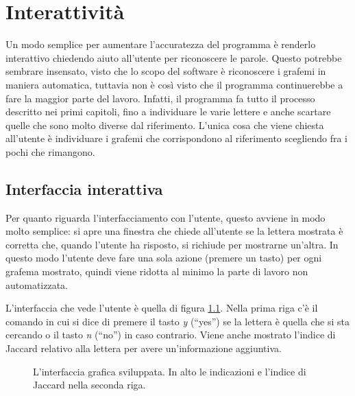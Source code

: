 \chapter{Interattivit\`a}\label{ch:interactivity}

Un modo semplice per aumentare l'accuratezza del programma \`e renderlo interattivo chiedendo aiuto all'utente per riconoscere le parole. Questo potrebbe sembrare insensato, visto che lo scopo del software \`e riconoscere i grafemi in maniera automatica, tuttavia non \`e cos\`i visto che il programma continuerebbe a fare la maggior parte del lavoro. Infatti, il programma fa tutto il processo descritto nei primi capitoli, fino a individuare le varie lettere e anche scartare quelle che sono molto diverse dal riferimento. L'unica cosa che viene chiesta all'utente \`e individuare i grafemi che corrispondono al riferimento scegliendo fra i pochi che rimangono.

\section{Interfaccia interattiva}

Per quanto riguarda l'interfacciamento con l'utente, questo avviene in modo molto semplice: si apre una finestra che chiede all'utente se la lettera mostrata \`e corretta che, quando l'utente ha risposto, si richiude per mostrarne un'altra. In questo modo l'utente deve fare una sola azione (premere un tasto) per ogni grafema mostrato, quindi viene ridotta al minimo la parte di lavoro non automatizzata.

L'interfaccia che vede l'utente \`e quella di figura \ref{fig:gui}. Nella prima riga c'\`e il comando in cui si dice di premere il tasto \emph{y} (``yes'') se la lettera \`e quella che si sta cercando o il tasto \emph{n} (``no'') in caso contrario. Viene anche mostrato l'indice di Jaccard relativo alla lettera per avere un'informazione aggiuntiva.

\begin{figure}
    \centering
    \caption{L'interfaccia grafica sviluppata. In alto le indicazioni e l'indice di Jaccard nella seconda riga.}
    \label{fig:gui}
\end{figure}

